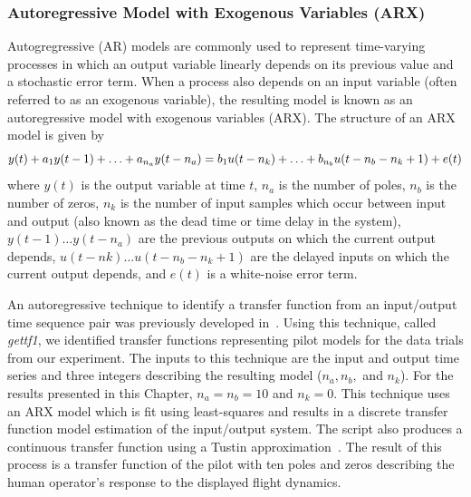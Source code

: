\subsubsection{Autoregressive Model with Exogenous Variables (ARX)}
Autogregressive (AR) models are commonly used to represent time-varying processes in which an output variable linearly depends on its previous value and a stochastic error term.
When a process also depends on an input variable (often referred to as an exogenous variable), the resulting model is known as an autoregressive model with exogenous variables (ARX).
The structure of an ARX model is given by
\begin{equation}
    y(t) + a_1 y(t-1) + \ldots + a_{n_a} y(t - n_a) = \\
    b_1 u(t-n_k) + \ldots + b_{n_b} u(t-n_b - n_k+1) + e(t)
\end{equation}
where $y(t)$ is the output variable at time $t$, $n_a$ is the number of poles, $n_b$ is the number of zeros, $n_k$ is the number of input samples which occur between input and output (also known as the dead time or time delay in the system), $y(t-1) \ldots y(t-n_a)$ are the previous outputs on which the current output depends, $u(t-nk) \ldots u(t-n_b - n_k+1)$ are the delayed inputs on which the current output depends, and $e(t)$ is a white-noise error term.

An autoregressive technique to identify a transfer function from an input/output time sequence pair was previously developed in~\citet{hess_modeling_2002}.
Using this technique, called \textit{gettf1}, we identified transfer functions representing pilot models for the data trials from our experiment.
The inputs to this technique are the input and output time series and three integers describing the resulting model ($n_a, n_b,$ and $n_k$).
For the results presented in this Chapter, $n_a = n_b = 10$ and $n_k = 0$.
This technique uses an ARX model which is fit using least-squares and results in a discrete transfer function model estimation of the input/output system.
The script also produces a continuous transfer function using a Tustin approximation~\cite{tustin1947method}.
The result of this process is a transfer function of the pilot with ten poles and zeros describing the human operator's response to the displayed flight dynamics.

